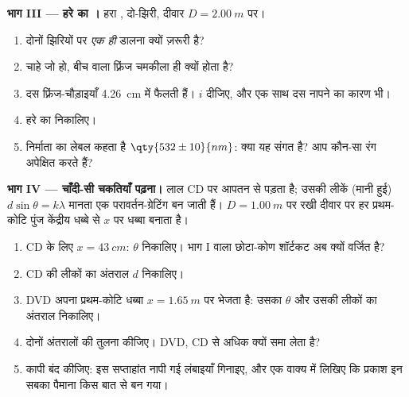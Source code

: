 \begin{problem}
\medskip
\noindent\textbf{भाग III --- हरे  का ।}
हरा , दो-झिरी, दीवार $D = \qty{2.00}{m}$ पर।
\begin{enumerate}[resume]
  \item दोनों झिरियों पर \emph{एक ही}  डालना क्यों ज़रूरी है?
  \item {} चाहे जो हो, बीच वाला फ़्रिंज चमकीला ही क्यों
        होता है?
  \item दस फ़्रिंज-चौड़ाइयाँ \qty{4.26}{cm} में फैलती हैं। $i$ दीजिए,
        और एक साथ दस नापने का कारण भी।
  \item हरे  का  निकालिए।
  \item निर्माता का लेबल कहता है $\qty{532 \pm 10}{nm}$: क्या यह संगत है? आप कौन-सा रंग
        अपेक्षित करते हैं?
\end{enumerate}

\medskip
\noindent\textbf{भाग IV --- चाँदी-सी चकतियाँ पढ़ना।} लाल  CD
पर  आपतन से पड़ता है; उसकी लीकें (मानी हुई) $d \sin\theta = k\lambda$ मानता एक
परावर्तन-ग्रेटिंग बन जाती हैं। $D =
\qty{1.00}{m}$ पर रखी दीवार पर हर प्रथम-कोटि पुंज
केंद्रीय धब्बे से $x$ पर धब्बा बनाता है।
\begin{enumerate}[resume]
  \item CD के लिए $x = \qty{43}{cm}$: $\theta$ निकालिए। भाग I वाला छोटा-कोण शॉर्टकट अब
        क्यों वर्जित है?
  \item CD की लीकों का अंतराल $d$ निकालिए।
  \item DVD अपना प्रथम-कोटि धब्बा $x = \qty{1.65}{m}$ पर भेजता है: उसका $\theta$ और उसकी
        लीकों का अंतराल निकालिए।
  \item दोनों अंतरालों की तुलना कीजिए। DVD, CD से अधिक क्यों समा लेता है?
  \item कापी बंद कीजिए: इस सप्ताहांत नापी गई लंबाइयाँ गिनाइए, और एक वाक्य
        में लिखिए कि प्रकाश इन सबका पैमाना किस बात से बन गया।
\end{enumerate}
\end{problem}
